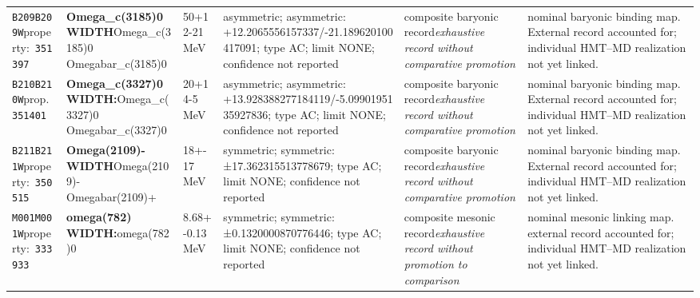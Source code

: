 \begin{landscape}
\begin{longtable}{L{1.85cm}L{4.45cm}L{2.35cm}L{4.05cm}L{3.35cm}L{7.15cm}}
\texttt{B209}\newline \texttt{B209W}\newline property:\ \texttt{351397} & \textbf{Omega\_\allowbreak{}c(3185)0 WIDTH}\newline Omega\_\allowbreak{}c(3185)0 \textbar{}\allowbreak{} Omegabar\_\allowbreak{}c(3185)0 & 50+12-21\,MeV & asymmetric; asymmetric: +12.2065556157337/-21.189620100417091; type AC; limit NONE; confidence not reported & composite baryonic record\newline \emph{exhaustive record without comparative promotion} & nominal baryonic binding map. External record accounted for; individual HMT--MD realization not yet linked. \\
\texttt{B210}\newline \texttt{B210W}\newline prop.\ \texttt{351401} & \textbf{Omega\_\allowbreak{}c(3327)0 WIDTH:}\newline Omega\_\allowbreak{}c(3327)0 \textbar{}\allowbreak{} Omegabar\_\allowbreak{}c(3327)0 & 20+14-5\,MeV & asymmetric; asymmetric: +13.928388277184119/-5.0990195135927836; type AC; limit NONE; confidence not reported & composite baryonic record\newline \emph{exhaustive record without comparative promotion} & nominal baryonic binding map. External record accounted for; individual HMT--MD realization not yet linked. \\
\texttt{B211}\newline \texttt{B211W}\newline property:\ \texttt{350515} & \textbf{Omega(2109)- WIDTH}\newline Omega(2109)- \textbar{}\allowbreak{} Omegabar(2109)+ & 18+-17\,MeV & symmetric; symmetric: ±17.362315513778679; type AC; limit NONE; confidence not reported & composite baryonic record\newline \emph{exhaustive record without comparative promotion} & nominal baryonic binding map. External record accounted for; individual HMT--MD realization not yet linked. \\
\texttt{M001}\newline \texttt{M001W}\newline property:\ \texttt{333933} & \textbf{omega(782) WIDTH:}\newline omega(782)0 & 8.68+-0.13\,MeV & symmetric; symmetric: ±0.1320000870776446; type AC; limit NONE; confidence not reported & composite mesonic record\newline \emph{exhaustive record without promotion to comparison} & nominal mesonic linking map. external record accounted for; individual HMT--MD realization not yet linked. \\

\end{longtable}
\end{landscape}

